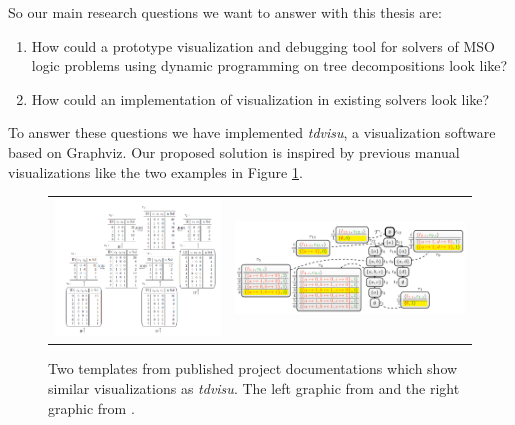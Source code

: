 \documentclass[a4paper, 12pt, bibliography=totoc]{scrartcl}
\begin{document}
So our main research questions we want to answer with this thesis are:
\begin{enumerate}
	\item How could a prototype visualization and debugging tool for solvers of MSO logic problems using dynamic programming on tree decompositions look like?
	\item How could an implementation of visualization in existing solvers look like?
\end{enumerate}
\noindent
To answer these questions we have implemented \textit{tdvisu}, a visualization software based on {Graphviz}. 
Our proposed solution is inspired by previous manual visualizations like the two examples in Figure \ref{fig:prevvisus}.
\begin{figure}[h]
	
	\centering
	\begin{tabularx}{\textwidth}{ X X }
		\includegraphics[width=1.05\linewidth,valign=c]{images/DualDA43.png} &  
		\includegraphics[width=1.02\linewidth,valign=c]{images/dpdbVisuSat.png}\\ 
		
	\end{tabularx}	
	
	\caption[Examples from previous manual visualization]{Two templates from published project documentations which show similar visualizations as \textit{tdvisu}. The left graphic from \cite[Figure 4.3, page 29]{DiplomarbeitZisser} and the right graphic from \cite[Figure 2, page 4]{dpdbpadl2020}.}
	\label{fig:prevvisus}
\end{figure}
\end{document}
